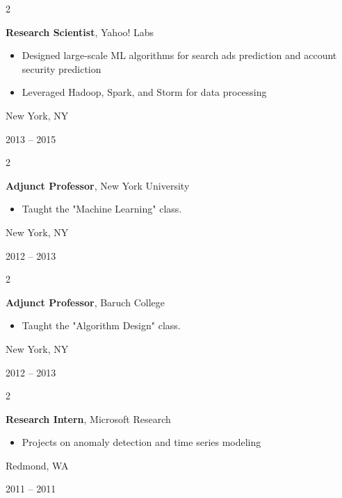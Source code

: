 \documentclass[10pt, letterpaper]{article}
\newenvironment{highlights}{
    \begin{itemize}[
        topsep=0.10 cm,
        parsep=0.10 cm,
        partopsep=0pt,
        itemsep=0pt,
        leftmargin=0.4 cm + 10pt
    ]
}{
    \end{itemize}
}
\newenvironment{twocolentry}[2][]{
    \onecolentry
    \def\secondColumn{#2}
    \setcolumnwidth{\fill, 4.5 cm}
    \begin{paracol}{2}
}{
    \switchcolumn \raggedleft \secondColumn
    \end{paracol}
    \endonecolentry
}
\begin{document}
    \vspace{0.2 cm}

    \begin{twocolentry}{
        New York, NY

        2013 -- 2015
    }
        \textbf{Research Scientist}, Yahoo! Labs
        \begin{highlights}
            \item Designed large-scale ML algorithms for search ads prediction and account security prediction
            \item Leveraged Hadoop, Spark, and Storm for data processing
        \end{highlights}
    \end{twocolentry}

    \vspace{0.2 cm}

    \begin{twocolentry}{
        New York, NY

        2012 -- 2013
    }
        \textbf{Adjunct Professor}, New York University
        \begin{highlights}
            \item Taught the "Machine Learning" class.
        \end{highlights}
    \end{twocolentry}    

    \vspace{0.2 cm}

    \begin{twocolentry}{
        New York, NY

        2012 -- 2013
    }
        \textbf{Adjunct Professor}, Baruch College
        \begin{highlights}
            \item Taught the "Algorithm Design" class.
        \end{highlights}
    \end{twocolentry}    

    \vspace{0.2 cm}

    \begin{twocolentry}{
        Redmond, WA

        2011 -- 2011
    }
        \textbf{Research Intern}, Microsoft Research
        \begin{highlights}
            \item Projects on anomaly detection and time series modeling
        \end{highlights}
    \end{twocolentry}
\end{document}
